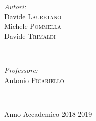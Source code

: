 \documentclass[a4paper,12pt]{report}
\begin{document}
\begin{titlepage}
		
		\vspace{-1.5cm}
		\begin{minipage}{0.4\textwidth}
			\begin{flushleft} \large
				\emph{Autori:}\\
				Davide  \textsc{Lauretano \\} Michele  \textsc{Pommella} \\Davide  \textsc{Trimaldi \\}
			\end{flushleft}
		\end{minipage}
		~
		\begin{minipage}{0.4\textwidth}
			\begin{flushright} \large
				\emph{Professore:} \\
				Antonio  \textsc{Picariello \\}
			\end{flushright}
		\end{minipage}\\
		\begin{center}
			\vfill
			{\sc Anno Accademico 2018-2019}
		\end{center}
	\end{titlepage}
	
	
	
	\tableofcontents
	\listoffigures
	\listoftables
	
	
	
	
	
	
\end{document}
